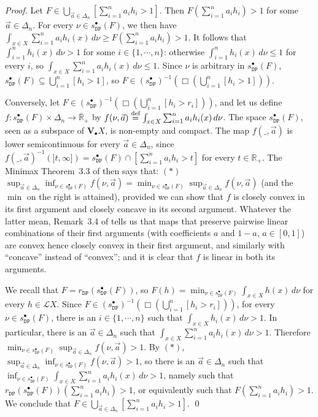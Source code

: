 \documentclass[preprint,12pt]{elsarticle}
\newcommand\eqdef{\mathrel{\buildrel \text{def}\over=}}
\newcommand{\creal}{\overline{\mathbb{R}}_+}
\newcommand{\Rp}{\mathbb{R}_+}
\newcommand\Lform{\mathcal L}
\newcommand\Demon{{\mathtt{D}}}
\newcommand\Nature{{\mathtt{P}}}
\newcommand\DN{{\Demon\Nature}}
\newcommand\Val{{\mathbf V}}
\begin{document}
\begin{proof}
  Let
  $F \in \bigcup_{\vec a \in \Delta_n} \left[\sum_{i=1}^n a_i h_i >
    1\right]$.  Then $F (\sum_{i=1}^n a_i h_i) > 1$ for some
  $\vec a \in \Delta_n$.  For every $\nu \in s_\DN^\bullet (F)$, we
  then have
  $\int_{x \in X} \sum_{i=1}^n a_i h_i (x) \,d\nu \geq F (\sum_{i=1}^n
  a_i h_i) > 1$.  It follows that $\int_{i=1}^n h_i (x) \,d\nu > 1$
  for some $i \in \{1, \cdots, n\}$: otherwise
  $\int_{i=1}^n h_i (x) \,d\nu \leq 1$ for every $i$, so
  $\int_{x \in X} \sum_{i=1}^n a_i h_i (x) \,d\nu \leq 1$.  Since
  $\nu$ is arbitrary in $s_\DN^\bullet (F)$,
  $s_\DN^\bullet (F) \subseteq \bigcup_{i=1}^n [h_i > 1]$, so
  $F \in {(s_\DN^\bullet)}^{-1} (\Box {(\bigcup_{i=1}^n [h_i > 1])})$.

  Conversely, let
  $F \in {(s_\DN^\bullet)}^{-1} (\Box {(\bigcup_{i=1}^n [h_i > r_i])})$, and let
  us define $f \colon s_\DN^\bullet (F) \times \Delta_n \to \creal$ by
  $f (\nu, \vec a) \eqdef \int_{x \in X} \sum_{i=1}^n a_i h_i (x)
  \,d\nu$.  The space $s_\DN^\bullet (F)$, seen as a subspace of
  $\Val_\bullet X$, is non-empty and compact.  The map
  $f (\_, \vec a)$ is lower semicontinuous for every
  $\vec a \in \Delta_n$, since
  $f (\_, \vec a)^{-1} (]t, \infty]) = s_\DN^\bullet (F) \cap
  [\sum_{i=1}^n a_i h_i > t]$ for every $t \in \Rp$.  The Minimax
  Theorem~3.3 of \cite{JGL-minimax17} then says that: $(*)$
  $\sup_{\vec a \in \Delta_n} \inf_{\nu \in s_\DN^\bullet (F)} f (\nu,
  \vec a) = \min_{\nu \in s_\DN^\bullet (F)} \sup_{\vec a \in
    \Delta_n} f (\nu, \vec a)$ (and the $\min$ on the right is
  attained), provided we can show that $f$ is closely convex in its
  first argument and closely concave in its second argument.  Whatever
  the latter mean, Remark~3.4 of \cite{JGL-minimax17} tells us that
  maps that preserve pairwise linear combinations of their first
  arguments (with coefficients $a$ and $1-a$, $a \in [0, 1]$) are
  convex hence closely convex in their first argument, and similarly
  with ``concave'' instead of ``convex''; and it is clear that $f$ is
  linear in both its arguments.
  
  We recall that $F = r_\DN (s_\DN^\bullet (F))$, so
  $F (h) = \min_{\nu \in s_\DN^\bullet (F)} \int_{x \in X} h (x)
  \,d\nu$ for every $h \in \Lform X$.  Since
  $F \in {(s_\DN^\bullet)}^{-1} (\Box {(\bigcup_{i=1}^n [h_i > r_i])})$, for every
  $\nu \in s_\DN^\bullet (F)$, there is an $i \in \{1, \cdots, n\}$
  such that $\int_{x \in X} h_i (x) \,d\nu > 1$.  In particular, there
  is an $\vec a \in \Delta_n$ such that
  $\int_{x \in X} \sum_{i=1}^n a_i h_i (x) \,d\nu > 1$.  Therefore
  $\min_{\nu \in s_\DN^\bullet (F)} \sup_{\vec a \in \Delta_n} f (\nu,
  \vec a) > 1$.  By $(*)$,
  $\sup_{\vec a \in \Delta_n} \inf_{\nu \in s_\DN^\bullet (F)} f (\nu,
  \vec a) > 1$, so there is an $\vec a \in \Delta_n$ such that
  $\inf_{\nu \in s_\DN^\bullet (F)} \int_{x \in X} \sum_{i=1}^n a_i
  h_i (x) \,d\nu > 1$, namely such that
  $r_\DN (s_\DN^\bullet (F)) (\sum_{i=1}^n a_i h_i) > 1$, or
  equivalently such that $F (\sum_{i=1}^n a_i h_i) > 1$.  We conclude
  that
  $F \in \bigcup_{\vec a \in \Delta_n} \left[\sum_{i=1}^n a_i h_i >
    1\right]$.  \qed
\end{proof}
\end{document}
